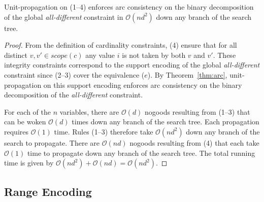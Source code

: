 \documentclass{tlp}
\newcommand{\scope}[1]{scope(#1)}
\begin{document}
\begin{corollary}
Unit-propagation on (1--4) enforces arc consistency on the binary decomposition of the global \emph{all-different} constraint in $\mathcal{O}(nd^2)$ down any branch of the search tree.
\end{corollary}
\begin{proof}
From the definition of cardinality constraints, (4) ensure that for all distinct $v,v' \in \scope{c}$ any value $i$ is not taken by both $v$ and $v'$. These integrity constraints correspond to the support encoding of the global \emph{all-different} constraint since (2--3) cover the equivalence ($e$).
By Theorem~\ref{thm:arc}, unit-propagation on this support encoding enforces arc consistency on the binary decomposition of the \emph{all-different} constraint.

For each of the $n$ variables, there are $\mathcal{O}(d)$ nogoods resulting from (1--3) that can be woken $\mathcal{O}(d)$ times down any branch of the search tree. Each propagation requires $\mathcal{O}(1)$ time. Rules (1--3) therefore take $\mathcal{O}(nd^2)$ down any branch of the search to propagate. There are $\mathcal{O}(nd)$ nogoods resulting from (4) that each take $\mathcal{O}(1)$ time to propagate down any branch of the search tree. The total running time is given by $\mathcal{O}(nd^2) + \mathcal{O}(nd) = \mathcal{O}(nd^2)$.
\end{proof}


\subsection{Range Encoding}
\end{document}

